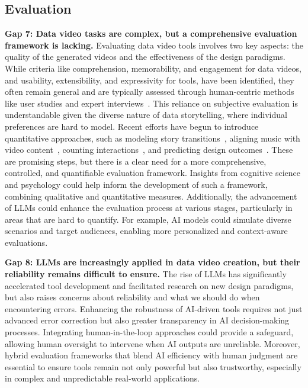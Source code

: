 \subsection{Evaluation}
\textbf{Gap 7: Data video tasks are complex, but a comprehensive evaluation framework is lacking.}
Evaluating data video tools involves two key aspects: the quality of the generated videos and the effectiveness of the design paradigms. 
While criteria like comprehension, memorability, and engagement for data videos, and usability, extensibility, and expressivity for tools, have been identified, they often remain general and are typically assessed through human-centric methods like user studies and expert interviews~\cite{Riche2018}. 
This reliance on subjective evaluation is understandable given the diverse nature of data storytelling, where individual preferences are hard to model. 
Recent efforts have begun to introduce quantitative approaches, such as modeling story transitions~\cite{Shi2021a}, aligning music with video content~\cite{Tang2022}, counting interactions~\cite{wonderflow}, and predicting design outcomes~\cite{Wang2021d}. 
These are promising steps, but there is a clear need for a more comprehensive, controlled, and quantifiable evaluation framework. 
Insights from cognitive science and psychology could help inform the development of such a framework, combining qualitative and quantitative measures. 
Additionally, the advancement of LLMs could enhance the evaluation process at various stages, particularly in areas that are hard to quantify. For example, AI models could simulate diverse scenarios and target audiences, enabling more personalized and context-aware evaluations.

\textbf{Gap 8: LLMs are increasingly applied in data video creation, but their reliability remains difficult to ensure.}
The rise of LLMs has significantly accelerated tool development and facilitated research on new design paradigms, but also raises concerns about reliability and what we should do when encountering errors. 
Enhancing the robustness of AI-driven tools requires not just advanced error correction but also greater transparency in AI decision-making processes. 
Integrating human-in-the-loop approaches could provide a safeguard, allowing human oversight to intervene when AI outputs are unreliable. 
Moreover, hybrid evaluation frameworks that blend AI efficiency with human judgment are essential to ensure tools remain not only powerful but also trustworthy, especially in complex and unpredictable real-world applications.

